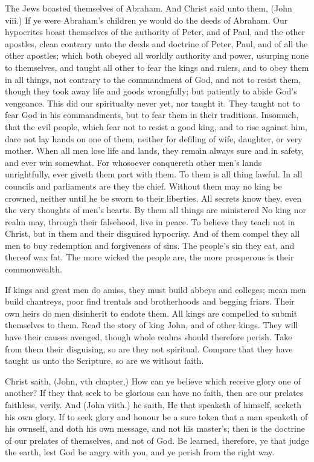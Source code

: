 The Jews boasted themselves of Abraham. And 
Christ said unto them, (John viii.) If ye were Abraham's
children ye would do the deeds of Abraham. Our 
hypocrites boast themselves of the authority of Peter, and of 
Paul, and the other apostles, clean contrary unto the deeds 
and doctrine of Peter, Paul, and of all the other apostles; 
which both obeyed all worldly authority and power, 
usurping none to themselves, and taught all other to fear 
the kings and rulers, and to obey them in all things, not 
contrary to the commandment of God, and not to resist 
them, though they took away life and goods wrongfully; 
but patiently to abide God's vengeance. This did our 
spiritualty never yet, nor taught it. They taught not to 
fear God in his commandments, but to fear them in their 
traditions. Insomuch, that the evil people, which fear 
not to resist a good king, and to rise against him, dare 
not lay hands on one of them, neither for defiling of wife, 
daughter, or very mother. When all men lose life and 
lands, they remain always sure and in safety, and ever 
win somewhat. For whosoever conquereth other men's 
lands unrightfully, ever giveth them part with them. To 
them is all thing lawful. In all councils and parliaments 
are they the chief. Without them may no king be 
crowned, neither until he be sworn to their liberties. 
All secrets know they, even the very thoughts of men's 
hearts. By them all things are ministered No king nor 
realm may, through their falsehood, live in peace. To 
believe they teach not in Christ, but in them and their 
disguised hypocrisy. And of them compel they all men 
to buy redemption and forgiveness of sins. The people's 
sin they eat, and thereof wax fat. The more wicked the 
people are, the more prosperous is their commonwealth. 

If kings and great men do amiss, they must build abbeys 
and colleges; mean men build chantreys, poor find 
trentals and brotherhoods and begging friars. Their own 
heirs do men disinherit to endote them. All kings are 
compelled to submit themselves to them. Read the story 
of king John, and of other kings. They will have their 
causes avenged, though whole realms should therefore 
perish. Take from them their disguising, so are they not 
spiritual. Compare that they have taught us unto the 
Scripture, so are we without faith. 

Christ saith, (John, vth chapter,) How can ye believe 
which receive glory one of another? If they that seek to 
be glorious can have no faith, then are our prelates faithless,
verily. And (John viith.) he saith, He that speaketh 
of himself, seeketh his own glory. If to seek glory and 
honour be a sure token that a man speaketh of his ownself,
and doth his own message, and not his master's; 
then is the doctrine of our prelates of themselves, and not 
of God. Be learned, therefore, ye that judge the earth, 
lest God be angry with you, and ye perish from the right 
way. 

